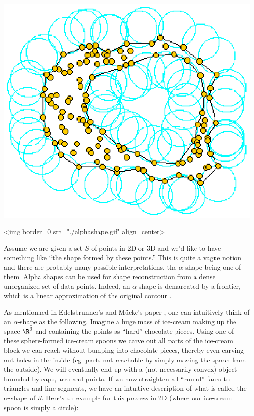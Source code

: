 \begin{ccTexOnly}
\vspace*{-1cm}
\includegraphics{alphashape.eps} 
\end{ccTexOnly}
\begin{ccHtmlOnly}
<img border=0 src="./alphashape.gif"  align=center>
\end{ccHtmlOnly}

Assume we are given a set $S$ of points in 2D or 3D and we'd like to
have something like ``the shape formed by these points.'' This is
quite a vague notion and there are probably many possible
interpretations, the $\alpha$-shape being one of them. Alpha shapes
can be used for shape reconstruction from a dense unorganized set of
data points. Indeed, an $\alpha$-shape is demarcated by a frontier,
which is a linear approximation of the original contour \cite{bb-srmua-97t}.

As mentionned in Edelsbrunner's and M\"ucke's paper \cite{em-tdas-94},
one can intuitively think of an $\alpha$-shape as the
following. Imagine a huge mass of ice-cream making up the space $\R^3$
and containing the points as ``hard'' chocolate pieces. Using one of
these sphere-formed ice-cream spoons we carve out all parts of the
ice-cream block we can reach without bumping into chocolate pieces,
thereby even carving out holes in the inside (eg. parts not reachable
by simply moving the spoon from the outside). We will eventually end
up with a (not necessarily convex) object bounded by caps, arcs and
points. If we now straighten all ``round'' faces to triangles and line
segments, we have an intuitive description of what is called the
$\alpha$-shape of $S$. Here's an example for this process in 2D (where
our ice-cream spoon is simply a circle):
                                                                        
